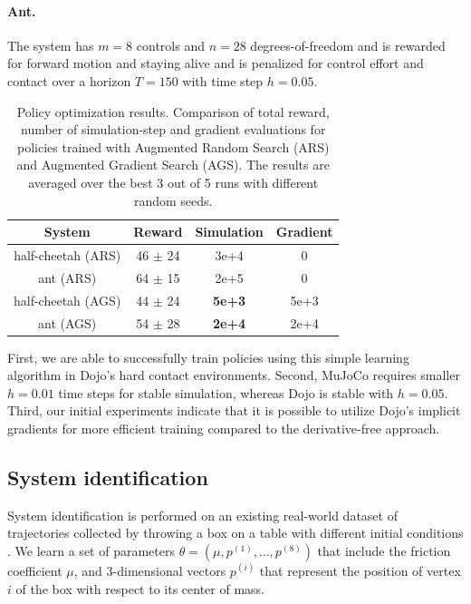 \paragraph{Ant.}
The system \cite{brockman2016openai} has $m = 8$ controls and $n = 28$ degrees-of-freedom and is rewarded for forward motion and staying alive and is penalized for control effort and contact over a horizon $T = 150$ with time step $h = 0.05$.

\begin{table}[H]
	\centering
	\caption[Numerical policy optimization results for half-cheetah and ant]{Policy optimization results. Comparison of total reward, number of simulation-step and gradient evaluations for policies trained with Augmented Random Search (ARS) \cite{mania2018simple} and Augmented Gradient Search (AGS). The results are averaged over the best 3 out of 5 runs with different random seeds.} 
	\begin{tabular}{c c c c}
		\toprule
		\textbf{System} & \textbf{Reward} & \textbf{Simulation} & \textbf{Gradient} \\
		\toprule
		half-cheetah (ARS) & 46 $\pm$ 24 & 3e{+}4 & 0 \\
		ant (ARS)          & 64 $\pm$ 15 & 2e{+}5 & 0 \\
		half-cheetah (AGS) & 44 $\pm$ 24 & \textbf{5e{+}3} & 5e{+}3 \\ 
		ant (AGS)          & 54 $\pm$ 28 & \textbf{2e{+}4} & 2e{+}4 \\
		\toprule
	\end{tabular}
	\label{dojo_rl_results}
\end{table}

First, we are able to successfully train policies using this simple learning algorithm in Dojo's hard contact environments. Second, MuJoCo requires smaller $h = 0.01$ time steps for stable simulation, whereas Dojo is stable with $h = 0.05$. Third, our initial experiments indicate that it is possible to utilize Dojo's implicit gradients for more efficient training compared to the derivative-free approach.

\subsection{System identification} 

System identification is performed on an existing real-world dataset of trajectories collected by throwing a box on a table with different initial conditions \cite{pfrommer2021contactnets}. We learn a set of parameters $\theta = (\mu, p^{(1)}, \dots, p^{(8)})$ that include the friction coefficient $\mu$, and 3-dimensional vectors $p^{(i)}$ that represent the position of vertex $i$ of the box with respect to its center of mass.

